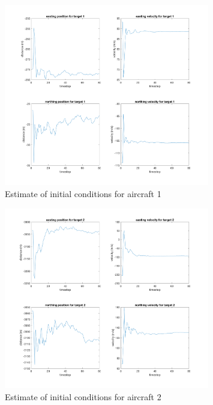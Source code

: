 \documentclass[11pt]{article}
\begin{document}
\begin{figure}[h]
	\centering
	\includegraphics[width=0.8\textwidth]{prob3c_plt1.png}
	\caption{Estimate of initial conditions for aircraft 1}
	\label{xA0}
\end{figure}
\begin{figure}[h]
	\centering
	\includegraphics[width=0.8\textwidth]{prob3c_plt2.png}
	\caption{Estimate of initial conditions for aircraft 2}
	\label{xB0}
\end{figure}
\end{document}
